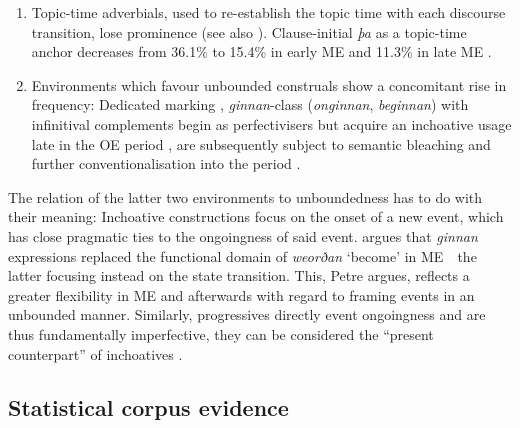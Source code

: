 \documentclass[output=paper,colorlinks,citecolor=brown]{langscibook}
\begin{document}
\begin{enumerate}
\item Topic-time adverbials, used to re-establish the topic time with each discourse transition, lose prominence (see also \cite{los2023decline}). Clause-initial \textit{þa} as a topic-time anchor decreases from 36.1\% to 15.4\% in early ME and 11.3\% in late ME \citep[93]{westergaard2009word}.
\item Environments which favour unbounded construals show a concomitant rise in frequency: Dedicated   marking \citep{Killie2008, killie2014development},  \textit{ginnan}-class (\textit{onginnan}, \textit{beginnan}) with infinitival complements \citep[468]{petre2010functions} begin as perfectivisers but acquire an inchoative usage late in the  OE period \citep[269--271]{Los2000}, are subsequently subject to semantic bleaching and further conventionalisation into the  period \citep{brinton1988, funke1922, mosse1938}.
\end{enumerate}

The relation of the latter two environments to unboundedness has to do with their meaning: Inchoative constructions focus on the onset of a new event, which has close pragmatic ties to the ongoingness of said event. \citet{petre2010functions} argues that \textit{ginnan} expressions replaced the functional domain of \textit{weorðan} `become' in ME\ \textendash{}\  the latter focusing instead on the state transition. This, Petre argues, reflects a greater flexibility in ME and afterwards with regard to framing events in an unbounded manner. Similarly, progressives directly  event ongoingness and are thus fundamentally imperfective, they can be considered the “present counterpart” of inchoatives \citep{carroll2004language}. 

\subsection{Statistical corpus evidence}\label{sec:Chark5.2}
\end{document}
